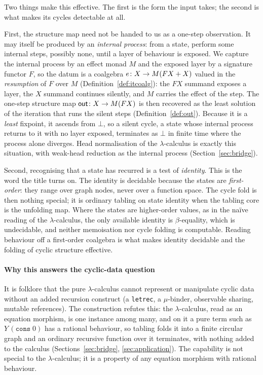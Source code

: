 Two things make this effective. The first is the form the input takes; the second is what makes its
cycles detectable at all.

First, the structure map need not be handed to us as a one-step observation. It may itself be
produced by an \emph{internal process}: from a state, perform some internal steps, possibly
none, until a layer of behaviour is exposed. We capture the internal process by an effect
monad $M$ and the exposed layer by a signature functor $F$, so the datum is a coalgebra
$e\colon X \to M(F X + X)$ valued in the \emph{resumption} of $F$ over $M$
(Definition~\ref{def:itcoalg}): the $F X$ summand exposes a layer, the $X$ summand continues
silently, and $M$ carries the effect of the step. The one-step structure map
$\mathsf{out} \colon X \to M(F X)$ is then recovered as the least solution of the iteration that runs
the silent steps (Definition~\ref{def:out}). Because it is a \emph{least} fixpoint, it ascends
from $\bot$, so a silent cycle, a state whose internal process returns to it with no layer
exposed, terminates as $\bot$ in finite time where the process alone diverges. Head
normalisation of the $\lambda$-calculus is exactly this situation, with weak-head reduction as
the internal process (Section~\ref{sec:bridge}).

Second, recognising that a state has recurred is a test of \emph{identity}. This is the word the
title turns on. The identity is decidable because the states are \emph{first-order}: they range
over graph nodes, never over a function space. The cycle fold is then nothing special; it is
ordinary tabling on state identity when the tabling core is the unfolding map. Where
the states are higher-order values, as in the na\"ive reading of the $\lambda$-calculus, the only
available identity is $\beta$-equality, which is undecidable, and neither memoisation nor cycle
folding is computable. Reading behaviour off a first-order coalgebra is what makes identity
decidable and the folding of cyclic structure effective.

\paragraph{Why this answers the cyclic-data question}
It is folklore that the pure $\lambda$-calculus cannot represent or manipulate cyclic data without
an added recursion construct (a \texttt{letrec}, a $\mu$-binder, observable sharing, mutable
references). The construction refutes this: the $\lambda$-calculus, read as an equation morphism,
is one instance among many, and on it a pure term such as $Y\,(\mathtt{cons}\;0)$ has a rational
behaviour, so tabling folds it into a finite circular graph and an ordinary recursive function over
it terminates, with nothing added to the calculus (Sections~\ref{sec:bridge}, \ref{sec:application}).
The capability is not special to the $\lambda$-calculus; it is a property of any equation morphism
with rational behaviour.

